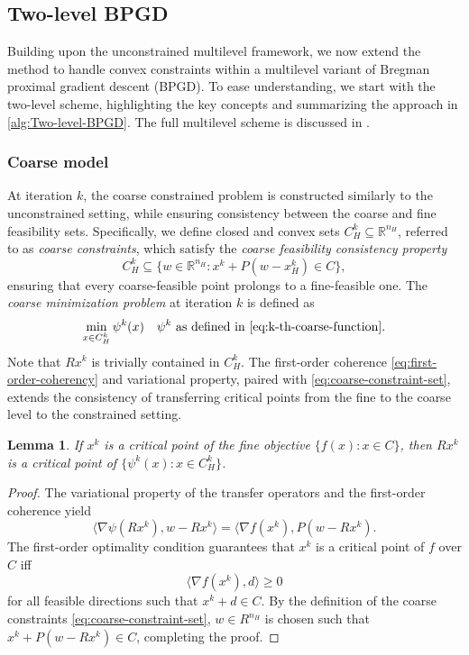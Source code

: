 \documentclass[11pt,reqno]{amsart}
\numberwithin{equation}{section}
\numberwithin{figure}{section}
\theoremstyle{plain}
\newtheorem{lemma}[theorem]{Lemma}
\theoremstyle{definition}
\newcommand{\R}{\mathbb{R}}
\newcommand{\la}{\langle}
\newcommand{\ra}{\rangle}
\newcommand{\df}{\nabla f}
\begin{document}
\subsection{Two-level BPGD}\label{sec:2l-BPGD}
Building upon the unconstrained multilevel framework, we now extend the method to handle convex constraints within a multilevel variant of Bregman proximal gradient descent (BPGD). To ease understanding, we start with the two-level scheme, highlighting the key concepts and summarizing the approach in \cref{alg:Two-level-BPGD}. The full multilevel scheme is discussed in .
\subsubsection{Coarse model}\label{sec:2l-BPGD-coarse-model}
At iteration $k$, the coarse constrained problem is constructed similarly to the unconstrained setting, while ensuring consistency between the coarse and fine feasibility sets. Specifically, we define closed and convex sets $C_H^k \subseteq \mathbb{R}^{n_H}$,
referred to as \textit{coarse constraints},
which satisfy the \textit{coarse feasibility consistency property}
\begin{equation} \label{eq:coarse-constraint-set}
    C_{H}^k \subseteq \{w \in \R^{n_H}: x^k + P(w - x_H^k) \in C \},
\end{equation}
ensuring that every coarse-feasible point prolongs to a fine-feasible one.
The \textit{coarse minimization problem} at iteration $k$ is defined as
\begin{equation} \label{eq:k-th-coarse-problem}
    \min_{x \in C_{H}^k} \psi^k(x) \quad \psi^k \text{ as defined in } \eqref{eq:k-th-coarse-function}.
\end{equation}
Note that $Rx^k$ is trivially contained in $C_H^k$. The first-order coherence \eqref{eq:first-order-coherency} and variational property, paired with \eqref{eq:coarse-constraint-set}, extends the consistency of transferring critical points from the fine to the coarse level to the constrained setting.
\begin{lemma}\label{lm:transferability-of-criticality}
        If $x^k$ is a critical point of the fine objective $\{f(x): x \in C\}$, then $Rx^k$ is a critical point of $\{\psi^k(x): x \in C^k_H\}$.
\end{lemma}
\begin{proof}
    The variational property of the transfer operators and the first-order coherence yield
    \begin{equation}
        \la \nabla \psi(Rx^k), w-Rx^k \ra = \la \df(x^k), P(w-Rx^k).
    \end{equation}
    The first-order optimality condition guarantees that $x^k$ is a critical point of $f$ over $C$ iff
    \begin{equation}
        \la \nabla f(x^k), d \ra \geq 0 
    \end{equation}
    for all feasible directions such that $x^k + d \in C$. By the definition of the coarse constraints \eqref{eq:coarse-constraint-set}, $w \in R^{n_H}$ is chosen such that $x^k + P(w-Rx^k) \in C$, completing the proof.
\end{proof}
\end{document}
